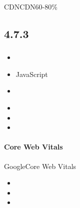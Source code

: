 \important{} CDNCDN60-80\%

\hypertarget{section-62}{%
\subsection{4.7.3}\label{section-62}}

\hypertarget{section-63}{%
\subsubsection{}\label{section-63}}

\hypertarget{section-64}{%
\paragraph{}\label{section-64}}


\begin{itemize}
\item
  \important{}
\item
  \important{}JavaScript
\item
  \important{}
\end{itemize}


\begin{itemize}
\item
  \important{}
\item
  \important{}
\item
  \important{}
\end{itemize}

\hypertarget{core-web-vitals}{%
\paragraph{Core Web Vitals}\label{core-web-vitals}}

GoogleCore Web Vitals

\begin{itemize}
\item
\item
\item
\end{itemize}

\hypertarget{section-65}{%
\subsubsection{}\label{section-65}}

